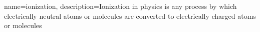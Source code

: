 {
    name=ionization,
    description={Ionization in physics is any process by which electrically neutral atoms or molecules are converted to electrically charged atoms or molecules}
}
